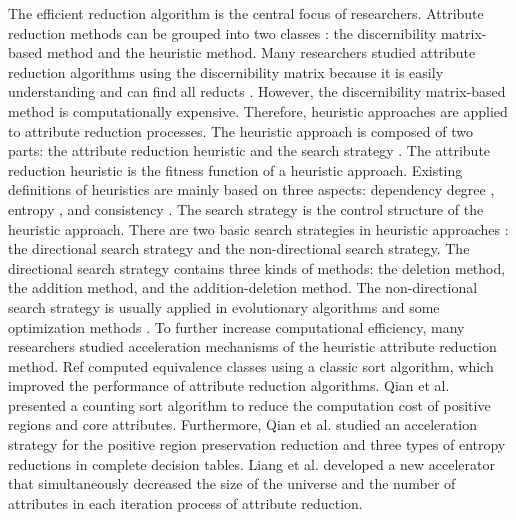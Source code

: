 \documentclass[review]{elsarticle}
\begin{document}
	\par The efficient reduction algorithm \cite{li2009approaches,meng2009fast,guoyin2001rough,wei2010relation} is the central focus of researchers. Attribute reduction methods can be grouped into two classes \cite{thangavel2009dimensionality}: the discernibility matrix-based method \cite{skowron1991towards,skowron1992discernibility} and the heuristic method. Many researchers studied attribute reduction algorithms using the discernibility matrix because it is easily understanding and can find all reducts \cite{kryszkiewicz2001comparative,zhang2003knowledge,miao2009relative,zhou2011analysis,deng2006new,wang2001reduction,xu2009efficient,yao2009discernibility}. However, the discernibility matrix-based method is computationally expensive. Therefore, heuristic approaches are applied to attribute reduction processes. The heuristic approach is composed of two parts: the attribute reduction heuristic and the search strategy \cite{yao2008reduct}. The attribute reduction heuristic is the fitness function of a heuristic approach. Existing definitions of heuristics are mainly based on three aspects: dependency degree \cite{hu1995learning}, entropy \cite{tian2013rough,Sun2017Continuous,Yan2017Entropy}, and consistency \cite{Dash2003Consistency,Hu2007Consistency}. The search strategy is the control structure of the heuristic approach. There are two basic search strategies in heuristic approaches \cite{Wang1998Analysis}: the directional search strategy and the non-directional search strategy. The directional search strategy contains three kinds of methods: the deletion method, the addition method, and the addition-deletion method. The non-directional search strategy is usually applied in evolutionary algorithms \cite{jia2013minimum,liu2010adaptive,shi2006heuristic,deng2009improved,ke2008efficient,dai2006particle} and some optimization methods \cite{hedar2008tabu,yu2011solving,jensen2004semantics,ye2007new}. To further increase computational efficiency, many researchers studied acceleration mechanisms of the heuristic attribute reduction method. Ref \cite{ge2017quick,liu2003research,xu2006quick} computed equivalence classes using a classic sort algorithm, which improved the performance of attribute reduction algorithms. Qian et al. \cite{qian2011hybrid} presented a counting sort algorithm to reduce the computation cost of positive regions and core attributes. Furthermore, Qian et al. \cite{qian2010positive} studied an acceleration strategy for the positive region preservation reduction and three types of entropy reductions in complete decision tables. Liang et al. \cite{liang2013accelerator} developed a new accelerator that simultaneously decreased the size of the universe and the number of attributes in each iteration process of attribute reduction.
	
\end{document}
